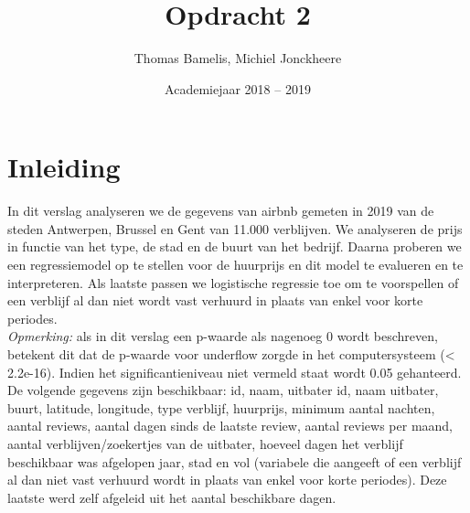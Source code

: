 \documentclass[a4paper,kulak]{kulakarticle} %
\date{Academiejaar 2018 -- 2019}
\title{Opdracht 2}
\author{Thomas Bamelis, Michiel Jonckheere}
\begin{document}
\maketitle

\section*{Inleiding}
In dit verslag analyseren we de gegevens van airbnb gemeten in 2019 van de steden Antwerpen, Brussel en Gent van 11.000 verblijven.
We analyseren de prijs in functie van het type, de stad en de buurt van het bedrijf.
Daarna proberen we een regressiemodel op te stellen voor de huurprijs en dit model te evalueren en te interpreteren.
Als laatste passen we logistische regressie toe om te voorspellen of een verblijf al dan niet wordt vast verhuurd in plaats van enkel voor korte periodes.\\
\textit{Opmerking:} als in dit verslag een p-waarde als nagenoeg 0 wordt beschreven, betekent dit dat de p-waarde voor underflow zorgde in het computersysteem (< 2.2e-16).
Indien het significantieniveau niet vermeld staat wordt 0.05 gehanteerd. \\
De volgende gegevens zijn beschikbaar: id, naam, uitbater id, naam uitbater, buurt, latitude, longitude, type verblijf, huurprijs, minimum aantal nachten, aantal reviews, aantal dagen sinds de laatste review, aantal reviews per maand, aantal verblijven/zoekertjes van de uitbater, hoeveel dagen het verblijf beschikbaar was afgelopen jaar, stad en vol (variabele die aangeeft of een verblijf al dan niet vast verhuurd wordt in plaats van enkel voor korte periodes).    
Deze laatste werd zelf afgeleid uit het aantal beschikbare dagen.
\end{document}
